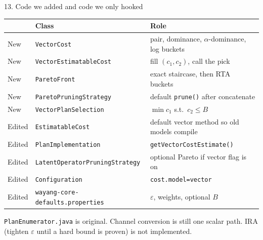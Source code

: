 \documentclass[aspectratio=169,11pt]{beamer}
\begin{document}
\begin{frame}{13. Code we added and code we only hooked}

{\small
\begin{tabular}{@{}lll@{}}
\toprule
 & \textbf{Class} & \textbf{Role} \\
\midrule
New & \texttt{VectorCost} & pair, dominance, \(\alpha\)-dominance, log buckets \\
New & \texttt{VectorEstimatableCost} & fill \((c_1,c_2)\), call the pick \\
New & \texttt{ParetoFront} & exact staircase, then RTA buckets \\
New & \texttt{ParetoPruningStrategy} & default \texttt{prune()} after concatenate \\
New & \texttt{VectorPlanSelection} & \(\min c_1\) s.t.\ \(c_2\le B\) \\
\midrule
Edited & \texttt{EstimatableCost} & default vector method so old models compile \\
Edited & \texttt{PlanImplementation} & \texttt{getVectorCostEstimate()} \\
Edited & \texttt{LatentOperatorPruningStrategy} & optional Pareto if vector flag is on \\
Edited & \texttt{Configuration} & \texttt{cost.model=vector} \\
Edited & \texttt{wayang-core-defaults.properties} & \(\varepsilon\), weights, optional \(B\) \\
\bottomrule
\end{tabular}}

\vspace{0.35cm}
{\small
\texttt{PlanEnumerator.java} is original. Channel conversion is still one scalar path.
IRA (tighten \(\varepsilon\) until a hard bound is proven) is not implemented.}
\end{frame}
\end{document}
